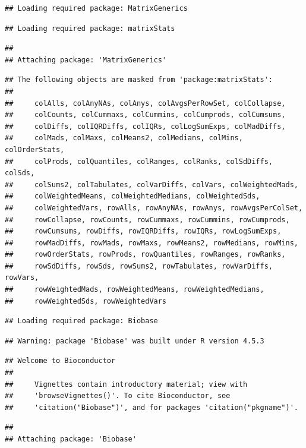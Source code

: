 \documentclass[
]{article}
\begin{document}
\begin{verbatim}
## Loading required package: MatrixGenerics
\end{verbatim}

\begin{verbatim}
## Loading required package: matrixStats
\end{verbatim}

\begin{verbatim}
## 
## Attaching package: 'MatrixGenerics'
\end{verbatim}

\begin{verbatim}
## The following objects are masked from 'package:matrixStats':
## 
##     colAlls, colAnyNAs, colAnys, colAvgsPerRowSet, colCollapse,
##     colCounts, colCummaxs, colCummins, colCumprods, colCumsums,
##     colDiffs, colIQRDiffs, colIQRs, colLogSumExps, colMadDiffs,
##     colMads, colMaxs, colMeans2, colMedians, colMins, colOrderStats,
##     colProds, colQuantiles, colRanges, colRanks, colSdDiffs, colSds,
##     colSums2, colTabulates, colVarDiffs, colVars, colWeightedMads,
##     colWeightedMeans, colWeightedMedians, colWeightedSds,
##     colWeightedVars, rowAlls, rowAnyNAs, rowAnys, rowAvgsPerColSet,
##     rowCollapse, rowCounts, rowCummaxs, rowCummins, rowCumprods,
##     rowCumsums, rowDiffs, rowIQRDiffs, rowIQRs, rowLogSumExps,
##     rowMadDiffs, rowMads, rowMaxs, rowMeans2, rowMedians, rowMins,
##     rowOrderStats, rowProds, rowQuantiles, rowRanges, rowRanks,
##     rowSdDiffs, rowSds, rowSums2, rowTabulates, rowVarDiffs, rowVars,
##     rowWeightedMads, rowWeightedMeans, rowWeightedMedians,
##     rowWeightedSds, rowWeightedVars
\end{verbatim}

\begin{verbatim}
## Loading required package: Biobase
\end{verbatim}

\begin{verbatim}
## Warning: package 'Biobase' was built under R version 4.5.3
\end{verbatim}

\begin{verbatim}
## Welcome to Bioconductor
## 
##     Vignettes contain introductory material; view with
##     'browseVignettes()'. To cite Bioconductor, see
##     'citation("Biobase")', and for packages 'citation("pkgname")'.
\end{verbatim}

\begin{verbatim}
## 
## Attaching package: 'Biobase'
\end{verbatim}
\end{document}
